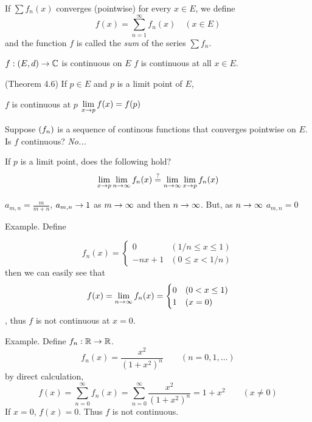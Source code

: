 \begin{defn}
    If \(\sum f_n(x)\) converges (pointwise) for every \(x \in E\), we define
    \[
        f(x) = \sum_{n=1}^\infty f_n(x) \quad (x \in E)
    \]
    and the function \(f\) is called the \textit{sum} of the series \(\sum f_n\).
\end{defn}

\begin{recall}
    \(f: (E, d) \rightarrow \mathbb{C}\) is continuous on \(E\) \miff \(f\) is continuous at all \(x \in E\).
\end{recall}

\begin{recall}
    (Theorem 4.6) If \(p \in E\) and \(p\) is a limit point of \(E\),
\begin{center}
    \(f\) is continuous at \(p\) \miff \(\displaystyle \lim_{x \rightarrow p} f(x) = f(p)\)
\end{center}
\end{recall}

\begin{question}
    Suppose \(\left( f_n \right)\) is a sequence of continous functions that converges pointwise on \(E\). Is \(f\) continuous? \textit{No...}
\end{question}

If \(p\) is a limit point, does the following hold?
\[
    \lim_{x\rightarrow p} \lim_{n\rightarrow \infty} f_n(x) \overset{?}{=} \lim_{n\rightarrow \infty} \lim_{x\rightarrow p}f_n(x)
\]

\begin{example}
    \(a_{m, n} = \frac{m}{m + n}\), \(a_{m, n} \rightarrow 1\) as \(m \rightarrow \infty\) and then \(n \rightarrow \infty\). But, as \(n \rightarrow \infty\) \(a_{m, n} = 0\)
\end{example}


Example. Define

\[
    f_n(x) = \begin{cases}
        0 & (1/n \leq x \leq 1) \\
        -nx + 1 & (0 \leq x < 1/n)
    \end{cases}
\]
then we can easily see that
\[
    f(x) = \lim_{n\rightarrow \infty} f_n(x) = \begin{cases}
        0 & (0 < x \leq 1) \\
        1 & (x = 0)
    \end{cases}
\], thus \(f\) is not continuous at \(x = 0\).

Example. Define \(f_n: \mathbb{R} \rightarrow \mathbb{R}\).
\[
    f_n(x) = \frac{x^2}{(1+x^2)^n}\qquad (n = 0, 1, \dots)
\] by direct calculation,
\[
    f(x) = \sum_{n = 0}^\infty f_n(x) = \sum_{n = 0}^\infty \frac{x^2}{(1 + x^2)^n} = 1 + x^2 \qquad (x \neq 0)
\]
If \(x = 0\), \(f(x) = 0\). Thus \(f\) is not continuous.

